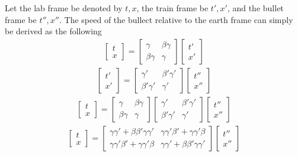 \documentclass[11pt,letterpaper]{book}
\begin{document}
Let the lab frame be denoted by $t,x$, the train frame be $t',x'$, and the bullet frame be $t'', x''$. The speed of the bullect relative to the earth frame can simply be derived as the following
\begin{align}
\begin{bmatrix}
    t \\ x
\end{bmatrix}
=
\begin{bmatrix}
    \gamma      &   \beta\gamma   \\
    \beta\gamma &   \gamma
\end{bmatrix}
\begin{bmatrix}
    t'\\ x'
\end{bmatrix}
\end{align}
\begin{align}
\begin{bmatrix}
    t' \\ x'
\end{bmatrix}
=
\begin{bmatrix}
    \gamma'      &   \beta'\gamma'   \\
    \beta'\gamma' &   \gamma'
\end{bmatrix}
\begin{bmatrix}
    t''\\ x''
\end{bmatrix}
\end{align}
\begin{align}
\begin{bmatrix}
    t\\ x
\end{bmatrix}
=
\begin{bmatrix}
    \gamma      &   \beta\gamma   \\
    \beta\gamma &   \gamma
\end{bmatrix}
\begin{bmatrix}
    \gamma'      &   \beta'\gamma'   \\
    \beta'\gamma' &   \gamma'
\end{bmatrix}
\begin{bmatrix}
    t''\\ x''
\end{bmatrix}
\end{align}
\begin{align}
\begin{bmatrix}
    t\\ x
\end{bmatrix}
=
\begin{bmatrix}
    \gamma \gamma' + \beta \beta' \gamma \gamma' & \gamma\gamma' \beta' + \gamma \gamma' \beta\\
    \gamma\gamma' \beta' + \gamma \gamma' \beta & \gamma \gamma' + \beta \beta' \gamma \gamma'
\end{bmatrix}
\begin{bmatrix}
    t''\\ x''
\end{bmatrix}
\end{align}
\end{document}
